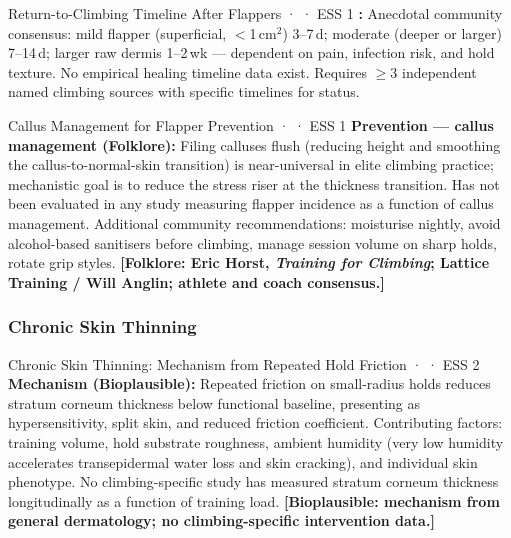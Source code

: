 \begin{toverifybox}{Return-to-Climbing Timeline After Flappers · \toverify · ESS 1}
\textbf{\toverify:} Anecdotal community consensus: mild flapper (superficial, $<$1\,cm$^2$) 3--7\,d; moderate (deeper or larger) 7--14\,d; larger raw dermis 1--2\,wk --- dependent on pain, infection risk, and hold texture. No empirical healing timeline data exist. Requires $\geq$3 independent named climbing sources with specific timelines for \folkloreverified status.
\end{toverifybox}

\begin{folklorebox}{Callus Management for Flapper Prevention · \folkloreverified · ESS 1}
\textbf{Prevention --- callus management (Folklore):} Filing calluses flush (reducing height and smoothing the callus-to-normal-skin transition) is near-universal in elite climbing practice; mechanistic goal is to reduce the stress riser at the thickness transition. Has not been evaluated in any study measuring flapper incidence as a function of callus management. Additional community recommendations: moisturise nightly, avoid alcohol-based sanitisers before climbing, manage session volume on sharp holds, rotate grip styles. \textbf{[Folklore: Eric Horst, \textit{Training for Climbing}; Lattice Training / Will Anglin; athlete and coach consensus.]}
\end{folklorebox}

\subsubsection{Chronic Skin Thinning}

\begin{bioplausbox}{Chronic Skin Thinning: Mechanism from Repeated Hold Friction · \bioplausible · ESS 2}
\textbf{Mechanism (Bioplausible):} Repeated friction on small-radius holds reduces stratum corneum thickness below functional baseline, presenting as hypersensitivity, split skin, and reduced friction coefficient. Contributing factors: training volume, hold substrate roughness, ambient humidity (very low humidity accelerates transepidermal water loss and skin cracking), and individual skin phenotype. No climbing-specific study has measured stratum corneum thickness longitudinally as a function of training load. \textbf{[Bioplausible: mechanism from general dermatology; no climbing-specific intervention data.]}
\end{bioplausbox}

